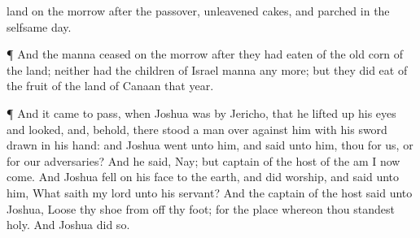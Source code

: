 {land on the
morrow after the
passover, unleavened
cakes, and
parched
{} in the
selfsame
day.
\par }{\PP {}¶ And the
manna
ceased on the
morrow after they had
eaten of the old
corn of the
land; neither had the
children of
Israel
manna any more; but they did
eat of the
fruit of the
land of
Canaan that
year.
\par }{\PP {}¶ And it came to pass, when
Joshua was by
Jericho, that he lifted
up his
eyes and
looked, and, behold, there
stood a
man over against him with his
sword
drawn in his
hand: and
Joshua
went unto him, and
said unto him,
{} thou for us, or for our
adversaries?
And he
said, Nay; but
{}
captain of the
host of the
{} am I now
come. And
Joshua
fell on his
face to the
earth, and did
worship, and
said unto him, What
saith my
lord unto his
servant?
And the
captain of the
{}
host
said unto
Joshua,
Loose thy
shoe from off thy
foot; for the
place whereon thou
standest
{}
holy. And
Joshua
did so.

}
